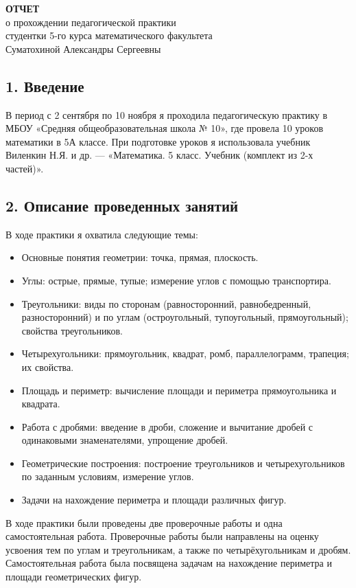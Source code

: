 \documentclass[a4paper,12pt]{article}
\begin{document}
\begin{center}
\textbf{ОТЧЕТ}\\
о прохождении педагогической практики\\
студентки 5-го курса математического факультета\\
Суматохиной Александры Сергеевны
\end{center}

\subsection*{1. Введение}

В период с 2 сентября по 10 ноября я проходила педагогическую практику в МБОУ «Средняя общеобразовательная школа № 10», где провела 10 уроков математики в 5А классе. При подготовке уроков я использовала учебник Виленкин Н.Я. и др. — «Математика. 5 класс. Учебник (комплект из 2-х частей)».

\subsection*{2. Описание проведенных занятий}

В ходе практики я охватила следующие темы:

\begin{itemize}
    \item Основные понятия геометрии: точка, прямая, плоскость.
    \item Углы: острые, прямые, тупые; измерение углов с помощью транспортира.
    \item Треугольники: виды по сторонам (равносторонний, равнобедренный, разносторонний) и по углам (остроугольный, тупоугольный, прямоугольный); свойства треугольников.
    \item Четырехугольники: прямоугольник, квадрат, ромб, параллелограмм, трапеция; их свойства.
    \item Площадь и периметр: вычисление площади и периметра прямоугольника и квадрата.
    \item Работа с дробями: введение в дроби, сложение и вычитание дробей с одинаковыми знаменателями, упрощение дробей.
    \item Геометрические построения: построение треугольников и четырехугольников по заданным условиям, измерение углов.
    \item Задачи на нахождение периметра и площади различных фигур.
\end{itemize}

В ходе практики были проведены две проверочные работы и одна самостоятельная работа. Проверочные работы были направлены на оценку усвоения тем по углам и треугольникам, а также по четырёхугольникам и дробям. Самостоятельная работа была посвящена задачам на нахождение периметра и площади геометрических фигур.
\end{document}
